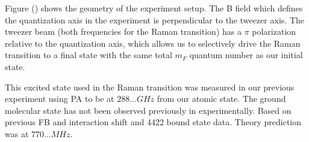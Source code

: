 \documentclass[aps,prl,twocolumn,groupedaddress]{revtex4-1}
\newcommand{\todo}[1]{}
\begin{document}
Figure () shows the geometry of the experiment setup. The B field which defines the quantization axis in the experiment is perpendicular to the tweezer axis. The tweezer beam (both frequencies for the Raman transition) has a $\pi$ polarization relative to the quantization axis, which allows us to selectively drive the Raman transition to a final state with the same total $m_F$ quantum number as our initial state.


This excited state used in the Raman transition was measured in our previous experiment using PA to be at $288... GHz$ from our atomic state. The ground molecular state has not been observed previously in experimentally. Based on previous FB and interaction shift and 4422 bound state data. Theory prediction was at $770... MHz$. \todo{more, mention/cite Jeremy}


\todo{Resonance observed at}
\todo{FWHM of line}

\todo{Rabi flopping}

\todo{Scattering}


\end{document}

